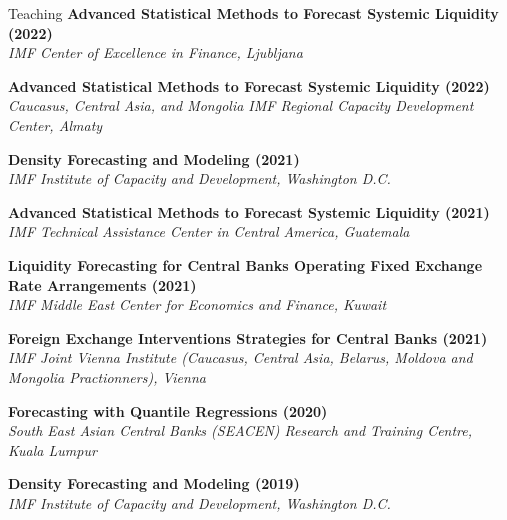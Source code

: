 \documentclass[usegeometry, 10pt, a4paper]{cv} %
\newcommand{\activite}[1]{\textbf{#1}\ }
\begin{document}
\begin{rubriquetableau}[0.95\textwidth]{Teaching}
\small
\activite{Advanced Statistical Methods to Forecast Systemic Liquidity (2022)} \\
\hspace{0.6cm} \small{\emph{IMF Center of Excellence in Finance, Ljubljana}}
\vspace{0.3cm}

\small
\activite{Advanced Statistical Methods to Forecast Systemic Liquidity (2022)} \\
\hspace{0.6cm} \small{\emph{Caucasus, Central Asia, and Mongolia IMF Regional Capacity Development Center, Almaty}}
\vspace{0.3cm}

\small
\activite{Density Forecasting and Modeling (2021)} \\
\hspace{0.6cm} \small{\emph{IMF Institute of Capacity and Development, Washington D.C.}}
\vspace{0.3cm}

\small
\activite{Advanced Statistical Methods to Forecast Systemic Liquidity (2021)} \\
\hspace{0.6cm} \small{\emph{IMF Technical Assistance Center in Central America, Guatemala}}
\vspace{0.3cm}
  
\small
\activite{Liquidity Forecasting for Central Banks Operating Fixed Exchange Rate Arrangements (2021)} \\
\hspace{0.6cm} \small{\emph{IMF Middle East Center for Economics and Finance, Kuwait}}
\vspace{0.3cm}

\small
\activite{Foreign Exchange Interventions Strategies for Central Banks (2021)} \\
\hspace{0.6cm} \small{\emph{IMF Joint Vienna Institute (Caucasus, Central
    Asia, Belarus, Moldova and Mongolia Practionners), Vienna}}
\vspace{0.3cm}

\small
\activite{Forecasting with Quantile Regressions (2020)} \\
\hspace{0.6cm} \small{\emph{South East Asian Central Banks (SEACEN) Research and Training Centre, Kuala Lumpur}}
\vspace{0.3cm}
  
\small
\activite{Density Forecasting and Modeling (2019)} \\
\hspace{0.6cm} \small{\emph{IMF Institute of Capacity and Development, Washington D.C.}}
\vspace{0.3cm}


\end{rubriquetableau}
\end{document}
